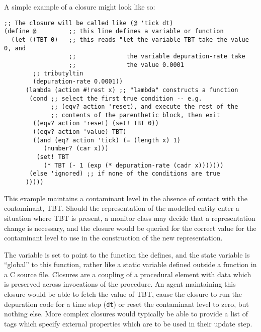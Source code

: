 A simple example of a closure might look like so:
\begin{verbatim}
;; The closure will be called like (@ 'tick dt) 
(define @         ;; this line defines a variable or function
  (let ((TBT 0)   ;; this reads "let the variable TBT take the value 0, and 
                  ;;              the variable depuration-rate take                  
                  ;;              the value 0.0001
        ;; tributyltin 
        (depuration-rate 0.0001))
      (lambda (action #!rest x) ;; "lambda" constructs a function
       (cond ;; select the first true condition -- e.g. 
             ;; (eqv? action 'reset), and execute the rest of the
             ;; contents of the parenthetic block, then exit
        ((eqv? action 'reset) (set! TBT 0))
        ((eqv? action 'value) TBT)
        ((and (eq? action 'tick) (= (length x) 1) 
           (number? (car x)))
         (set! TBT 
           (* TBT (- 1 (exp (* depuration-rate (cadr x)))))))
       (else 'ignored) ;; if none of the conditions are true
      )))))

\end{verbatim}
This example maintains a contaminant level in the absence of contact
with the contaminant, TBT.  Should the representation of the
modelled entity enter a situation where TBT is present, a monitor
class may decide that a representation change is necessary, and the
closure would be queried for the correct value for the contaminant
level to use in the construction of the new representation.

The variable  is set to point to the function the
 defines, and the state variable  is
``global'' to this function, rather like a static variable defined
outside a function in a C source file. Closures are a coupling of a
procedural element with data which is preserved across invocations of
the procedure. An agent maintaining this closure would be able to
fetch the value of TBT, cause the closure to run the depuration code
for a time step (\texttt{dt}) or reset the contaminant level to zero,
but nothing else.  More complex closures would typically be able to
provide a list of tags which specify external properties which are to
be used in their update step.

